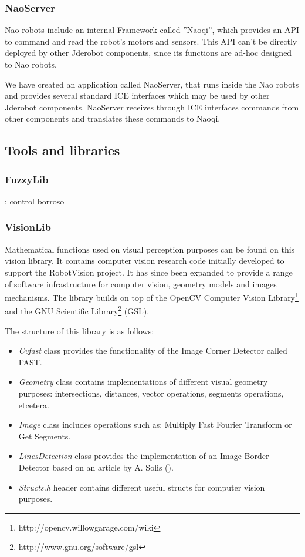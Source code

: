 \documentclass[twocolumn]{svjour3}          %
\begin{document}
\subsubsection{NaoServer}

Nao robots include an internal Framework called ''Naoqi'', which provides an API to command and read the robot's motors and sensors. This API can't be directly deployed by other Jderobot components, since its functions are ad-hoc designed to Nao robots.

We have created an application called NaoServer, that runs inside the Nao robots and provides several standard ICE interfaces which may be used by other Jderobot components. NaoServer receives through ICE interfaces commands from other components and translates these commands to Naoqi.

\subsection{Tools and libraries}

\subsubsection{FuzzyLib}: control borroso
\subsubsection{VisionLib}
\label{subsec:visionlib}

Mathematical functions used on visual perception purposes can be found on this vision library. It contains computer vision research code initially developed to support the RobotVision project. It has since been expanded to provide a range of software infrastructure for computer vision, geometry models and images mechanisms. The library builds on top of the OpenCV Computer Vision Library\footnote{http://opencv.willowgarage.com/wiki} and the GNU Scientific Library\footnote{http://www.gnu.org/software/gsl} (GSL).

The structure of this library is as follows:
\begin{itemize} 
\item \textit{Cvfast} class provides the functionality of the Image Corner Detector called FAST.
\item \textit{Geometry} class contains implementations of different visual geometry purposes: intersections, distances, vector operations, segments operations, etcetera.
\item \textit{Image} class includes operations such as: Multiply Fast Fourier Transform or Get Segments.
\item \textit{LinesDetection} class provides the implementation of an Image Border Detector based on an article by A. Solis (\cite{solis09}).
\item \textit{Structs.h} header contains different useful structs for computer vision purposes.
\end{itemize}
\end{document}
